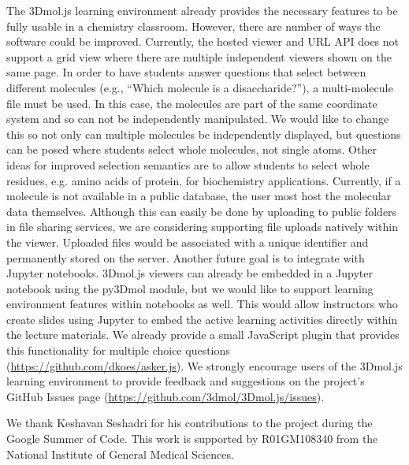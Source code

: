 \documentclass[journal=jceda8,manuscript=article]{achemso}
\begin{document}
The 3Dmol.js learning environment already provides the necessary features to be fully usable in a chemistry classroom.  However, there are number of ways the software could be improved.  Currently, the hosted viewer and URL API does not support a grid view where there are multiple independent viewers shown on the same page.  In order to have students answer questions that select between different molecules (e.g., ``Which molecule is a disaccharide?''), a multi-molecule file must be used. In this case, the molecules are part of the same coordinate system and so can not be independently manipulated.  We would like to change this so not only can multiple molecules be independently displayed, but questions can be posed where students select whole molecules, not single atoms.  Other ideas for improved selection semantics are to allow students to select whole residues, e.g. amino acids of protein, for biochemistry applications.  Currently, if a molecule is not available in a public database, the user most host the molecular data themselves.  Although this can easily be done by uploading to public folders in file sharing services, we are considering supporting file uploads natively within the viewer.  Uploaded files would be associated with a unique identifier and permanently stored on the server.  Another future goal is to integrate with Jupyter notebooks.  3Dmol.js viewers can already be embedded in a Jupyter notebook using the py3Dmol module, but we would like to support learning environment features within notebooks as well.  This would allow instructors who create slides using Jupyter to embed the active learning activities directly within the lecture materials. We already provide a small JavaScript plugin that provides this functionality for multiple choice questions (\url{https://github.com/dkoes/asker.js}).  
 We strongly encourage users of the 3Dmol.js learning environment to provide feedback and suggestions on the project's GitHub Issues page (\url{https://github.com/3dmol/3Dmol.js/issues}).
 


\begin{acknowledgement}



We thank Keshavan Seshadri for his contributions to the project during the Google Summer of Code.
  This work is supported by R01GM108340 from the National Institute of General Medical Sciences.

\end{acknowledgement}
\end{document}
